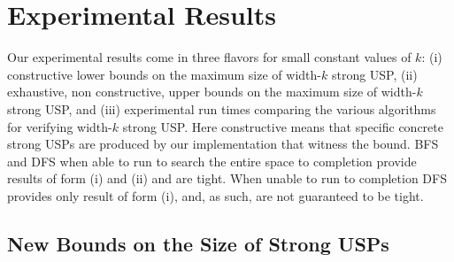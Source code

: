 \documentclass[11pt]{article}
\begin{document}
\begin{comment}
  Not planning to discuss:
  \begin{itemize}
  \item A$^*$ + admissible heuristics.
  \item Upper bounds from A$^*$.
  \item Symmetry removal.
  \end{itemize}
\end{comment}

\section{Experimental Results}
\label{sec:results}

Our experimental results come in three flavors for small constant
values of $k$: (i) constructive lower bounds on the maximum size of
width-$k$ strong USP, (ii) exhaustive, non constructive, upper bounds
on the maximum size of width-$k$ strong USP, and (iii) experimental
run times comparing the various algorithms for verifying width-$k$
strong USP.  Here constructive means that specific concrete strong
USPs are produced by our implementation that witness the bound.
\textsc{BFS} and \textsc{DFS} when able to run to search the entire
space to completion provide results of form (i) and (ii) and are
tight.  When unable to run to completion \textsc{DFS} provides only
result of form (i), and, as such, are not guaranteed to be tight.

\subsection{New Bounds on the Size of Strong USPs}
\label{subsec:usps_found}
\end{document}
